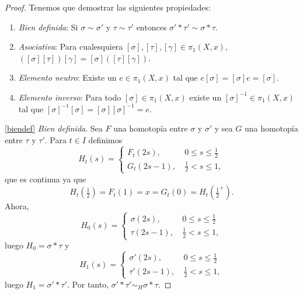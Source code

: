 \documentclass[12pt,a4paper]{book}
\theoremstyle{definition} \newtheorem{defn}[thm]{Definición}
\theoremstyle{definition} \newtheorem{ejemplo}[thm]{Ejemplo}
\theoremstyle{definition} \newtheorem{ejercicio}[thm]{Ejercicio}
\theoremstyle{remark} \newtheorem*{obs}{Observación}
\def\gf{\pi_1}
\begin{document}
\begin{proof}
  Tenemos que demostrar las siguientes propiedades:
  \begin{enumerate}[label=(\alph*)]
    \item\label{biendef} \textit{Bien definida}: Si $\sigma\sim\sigma'$ y $\tau \sim \tau'$ entonces $\sigma'*\tau'\sim \sigma * \tau$. 
    \item\label{asoc} \textit{Asociativa}: Para cualesquiera $[\sigma],[\tau],[\gamma] \in \gf(X,x)$, $([\sigma][\tau])[\gamma]=[\sigma]([\tau][\gamma])$.
    \item\label{neutro} \textit{Elemento neutro}: Existe un $e \in \gf(X,x)$ tal que $e[\sigma]=[\sigma]e=[\sigma]$.
    \item\label{inverso} \textit{Elemento inverso}: Para todo $[\sigma]\in \gf(X,x)$ existe un $[\sigma]^{-1} \in \gf(X,x)$ tal que $[\sigma]^{-1}[\sigma]=[\sigma][\sigma]^{-1}=e$.
  \end{enumerate}

  \ref{biendef} \textit{Bien definida}. Sea $F$ una homotopía entre $\sigma$ y $\sigma'$ y sea $G$ una homotopía entre $\tau$ y $\tau'$. Para $t \in I$ definimos
  \begin{equation*}
    H_t(s)=
    \begin{cases}
      F_t(2s), & \ 0\leq s\leq \tfrac{1}{2} \\
      G_t(2s-1), & \ \tfrac{1}{2} < s \leq 1,
    \end{cases}
  \end{equation*}
  que es continua ya que
  \begin{equation*}
    H_t\left(\tfrac{1}{2}\right)=F_t(1)=x=G_t(0)=H_t\left(\tfrac{1}{2}^+\right). 
  \end{equation*}
  Ahora, 
  \begin{equation*}
    H_0(s)=
    \begin{cases}
      \sigma(2s), & \ 0\leq s \leq \tfrac{1}{2} \\
      \tau (2s-1), & \ \tfrac{1}{2} < s \leq 1,
    \end{cases}
  \end{equation*}
  luego $H_0=\sigma*\tau$ y 
  \begin{equation*}
    H_1(s)=
    \begin{cases}
      \sigma'(2s), & \ 0\leq s \leq \tfrac{1}{2} \\
      \tau' (2s-1), & \ \tfrac{1}{2} < s \leq 1,
    \end{cases}
  \end{equation*}
  luego $H_1=\sigma'*\tau'$. Por tanto, $\sigma'*\tau' \sim_H \sigma*\tau$.


\end{proof}
\end{document}
